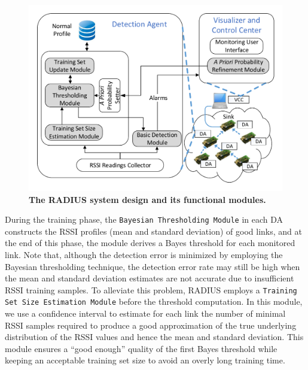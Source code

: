 \begin{figure}[t]
	\centering
	\includegraphics[width=1\linewidth]{system-architecture-new3}
	\vspace{-0.9cm}
	\caption{\textbf{The RADIUS system design and its functional modules.}}
	\label{fig:architecture}
	\vspace{-0.8cm}
\end{figure}

During the training phase, the \texttt{Bayesian Thresholding Module} in each DA constructs the RSSI profiles (mean and standard deviation) of good links, and at the end of this phase,  the module derives a Bayes threshold for each monitored link. Note that, although the detection error is minimized by employing the Bayesian thresholding technique, the detection error rate may still be high when the mean and standard deviation estimates are not accurate due to insufficient RSSI training samples. To alleviate this problem, RADIUS employs a \texttt{Training Set Size Estimation Module} before the threshold computation. In this module, we use a confidence interval to estimate for each link the number of minimal RSSI samples required to produce a good approximation of the true underlying distribution of the RSSI values and hence the mean and standard deviation. This module ensures a ``good enough'' quality of the first Bayes threshold while keeping an acceptable training set size to avoid an overly long training time. 


